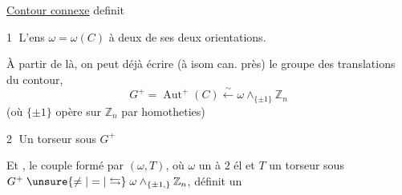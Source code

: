 \uline{Contour  connexe}  definit

\textcircled{1} L'ens $\omega=\omega(C)$ à deux  de ses deux orientations.

À partir de là, on peut déjà écrire (à isom can. près) le groupe des translations du contour, 
\[
 G^+=\operatorname{Aut}^+(C)\xleftarrow{\sim}\omega\wedge_{\{\pm1\}}\mathbb Z_n
\]
(où $\{\pm1\}$ opère sur $\mathbb Z_n$ par homotheties)

\textcircled{2} Un torseur sous $G^+$

 Et , le couple formé par $(\omega,T)$, où $\omega$ un  à $2$ él et $T$ un torseur sous $G^+\mathrel{\unsure{\ne|=|\leftrightarrows}}\omega\wedge_{\{\pm1,\}}\mathbb Z_n$, définit un
